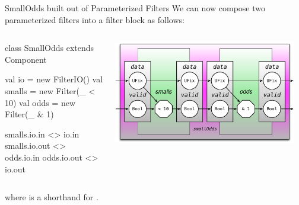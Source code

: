 \documentclass[xcolor=pdflatex,dvipsnames,table]{beamer}
\begin{document}
\begin{frame}[fragile]{SmallOdds built out of Parameterized Filters}
We can now compose two parameterized filters into a filter block as follows:

\begin{columns}

{
\begin{scala}
class SmallOdds extends Component { 
  val io     = new FilterIO()
  val smalls = new Filter(_ < 10)
  val odds   = new Filter(_ & 1)

  smalls.io.in  <> io.in
  smalls.io.out <> odds.io.in
  odds.io.out   <> io.out
}
\end{scala}
}


\begin{center}
\includegraphics[width=0.95\textwidth]{figs/small-odds.pdf} 
\end{center}

\end{columns}

\noindent
where  is a shorthand for .
\end{frame}
\end{document}
